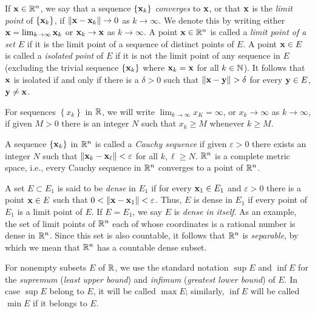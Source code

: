 If $\mathbf{x}\in\mathbb{R}^n$, we say that a sequence $\{\mathbf{x}_k\}$ \emph{converges} to
$\mathbf{x}$, or that $\mathbf{x}$ is the \emph{limit point} of $\{\mathbf{x}_k\}$, if
$\|\mathbf{x}-\mathbf{x}_k\|\to 0$ as $k\to\infty$. We denote this by writing either
$\mathbf{x}=\lim_{k\to\infty}\mathbf{x}_k$ or $\mathbf{x}_k\to\mathbf{x}$ as $k\to\infty$. A point
$\mathbf{x}\in\mathbb{R}^n$ is called a \emph{limit point of a set $E$} if it is the
limit point of a sequence of distinct points of $E$. A point $\mathbf{x}\in E$ is
called a \emph{isolated point} of $E$ if it is not the limit point of any
sequence in $E$ (excluding the trivial sequence $\left\{\mathbf{x}_k\right\}$
where $\mathbf{x}_k=\mathbf{x}$ for all $k\in\mathbb{N}$). It follows that $\mathbf{x}$ is isolated
if and only if there is a $\delta>0$ such that $\|\bfx-\bfy\|>\delta$ for
every $\mathbf{y}\in E$, $\mathbf{y}\neq\mathbf{x}$.

For sequences $\left\{x_k\right\}$ in $\mathbb{R}$, we will write
$\lim_{k\to\infty} x_K=\infty$, or $x_k\to\infty$ as $k\to\infty$, if given
$M>0$ there is an integer $N$ such that $x_k\geq M$ whenever $k\geq M$.

A sequence $\left\{ \mathbf{x}_k \right\}$ in $\mathbb{R}^n$ is called a \emph{Cauchy
  sequence} if given $\varepsilon>0$ there exists an integer $N$ such that
$\|\mathbf{x}_k-\mathbf{x}_\ell\|<\varepsilon$ for all $k,\ell\geq N$. $\mathbb{R}^n$ is a
complete metric space, i.e., every Cauchy sequence in $\mathbb{R}^n$ converges to
a point of $\mathbb{R}^n$.

A set $E\subset E_1$ is said to be \emph{dense} in $E_1$ if for every
$\mathbf{x}_1\in E_1$ and $\varepsilon>0$ there is a point $\mathbf{x}\in E$ such that
$0<\|\mathbf{x}-\mathbf{x}_1\|<\varepsilon$. Thus, $E$ is dense in $E_1$ if every point
of $E_1$ is a limit point of $E$. If $E=E_1$, we say $E$ is \emph{dense in
  itself}. As an example, the set of limit points of $\mathbb{R}^n$ each of whose
coordinates is a rational number is dense in $\mathbb{R}^n$. Since this set is
also countable, it follows that $\mathbb{R}^n$ is \emph{separable}, by which we
mean that $\mathbb{R}^n$ has a countable dense subset.

For nonempty subsets $E$ of $\mathbb{R}$, we use the standard notation $\sup E$
and $\inf E$ for the \emph{supremum} (\emph{least upper bound}) and
\emph{infimum} (\emph{greatest lower bound}) of $E$. In case $\sup E$
belong to $E$, it will be called $\max E$; similarly, $\inf E$ will be
called $\min E$ if it belongs to $E$.

